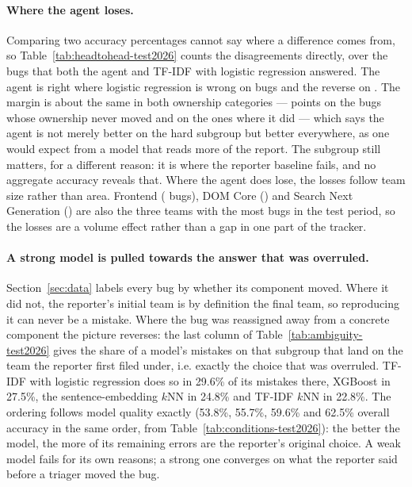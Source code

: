 \documentclass[sigconf,anonymous]{acmart}
\begin{document}
\paragraph{Where the agent loses.}
Comparing two accuracy percentages cannot say where a difference comes from, so
Table~\ref{tab:headtohead-test2026} counts the disagreements directly, over the \nSharedN{} bugs
that both the agent and TF-IDF with logistic regression answered. The agent is right where logistic
regression is wrong on \nAgentOnly{} bugs and the reverse on \nLrOnly{}. The margin is about the same
in both ownership categories --- \nNetNever{} points on the bugs whose ownership never moved and
\nNetMoved{} on the ones where it did --- which says the agent is not merely better on the hard
subgroup but better everywhere, as one would expect from a model that reads more of the report. The
subgroup still matters, for a different reason: it is where the reporter baseline fails, and no
aggregate accuracy reveals that. Where the agent does lose, the losses follow team size rather than
area. Frontend (\nLossOne{} bugs), DOM Core (\nLossTwo{}) and Search Next Generation (\nLossThree{})
are also the three teams with the most bugs in the test period, so the losses are a volume effect
rather than a gap in one part of the tracker.



\paragraph{A strong model is pulled towards the answer that was overruled.}
Section~\ref{sec:data} labels every bug by whether its component moved. Where it did not, the
reporter's initial team is by definition the final team, so reproducing it can never be a mistake.
Where the bug was reassigned away from a concrete component the picture reverses: the last column
of Table~\ref{tab:ambiguity-test2026} gives the share of a model's mistakes on that subgroup that
land on the team the reporter first filed under, i.e. exactly the choice that was overruled.
TF-IDF with logistic regression does so in 29.6\% of its mistakes there, XGBoost in 27.5\%, the
sentence-embedding $k$NN in 24.8\% and TF-IDF $k$NN in 22.8\%. The ordering follows model quality
exactly (53.8\%, 55.7\%, 59.6\% and 62.5\% overall accuracy in the same order, from
Table~\ref{tab:conditions-test2026}): the better the model, the more of its remaining errors are
the reporter's original choice. A weak model fails for its own reasons; a strong one converges on
what the reporter said before a triager moved the bug.
\end{document}
